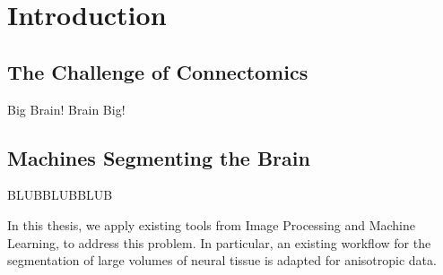 
\chapter{Introduction} %

\label{Chapter1} %


\section{The Challenge of Connectomics}
Big Brain! Brain Big!

\section{Machines Segmenting the Brain}

BLUBBLUBBLUB

In this thesis, we apply existing tools from Image Processing and Machine Learning, to address this problem.
In particular, an existing workflow for the segmentation of large volumes of neural tissue is adapted for anisotropic data.


